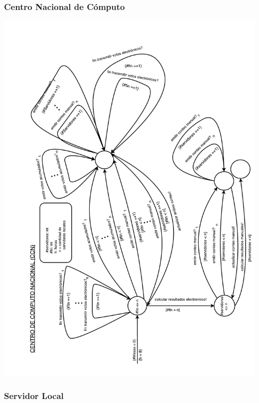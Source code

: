 \documentclass[spanish, 10pt,a4paper]{article}
\numberwithin{equation}{section} %
\begin{document}
\par 
\subsubsection{Centro Nacional de Cómputo}
\vspace{\baselineskip}
    \begin{center}
                \includegraphics[scale=0.75, page=1]{imagenes/fsm/FSMCCN.pdf}
                \\
                \vspace{1pt}
                \footnotesize\textit{}
        \end{center}
\vspace{\baselineskip}

\subsubsection{Servidor Local}
\end{document}
